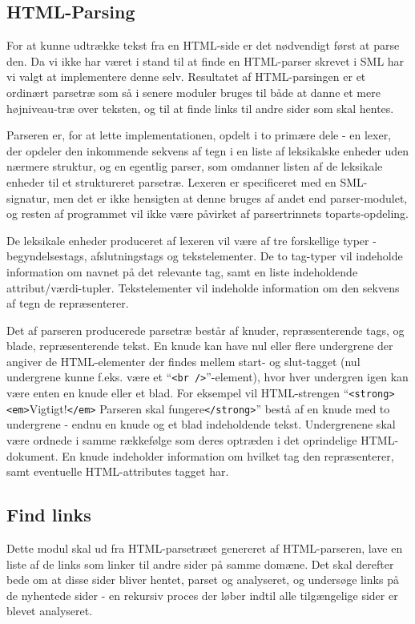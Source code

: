\documentclass[a4paper,oneside,article, titlepage]{article}
\begin{document}
\subsection{HTML-Parsing}
For at kunne udtrække tekst fra en HTML-side er det nødvendigt først
at parse den. Da vi ikke har været i stand til at finde en HTML-parser
skrevet i SML har vi valgt at implementere denne selv. Resultatet af
HTML-parsingen er et ordinært parsetræ som så i senere moduler bruges
til både at danne et mere højniveau-træ over teksten, og til at finde
links til andre sider som skal hentes.

Parseren er, for at lette implementationen, opdelt i to primære dele -
en lexer, der opdeler den inkommende sekvens af tegn i en liste af
leksikalske enheder uden nærmere struktur, og en egentlig parser, som
omdanner listen af de leksikale enheder til et struktureret
parsetræ. Lexeren er specificeret med en SML-signatur, men det er ikke
hensigten at denne bruges af andet end parser-modulet, og resten af
programmet vil ikke være påvirket af parsertrinnets toparts-opdeling.

De leksikale enheder produceret af lexeren vil være af tre forskellige
typer - begyndelsestags, afslutningstags og tekstelementer. De to
tag-typer vil indeholde information om navnet på det relevante tag,
samt en liste indeholdende attribut/værdi-tupler. Tekstelementer vil
indeholde information om den sekvens af tegn de repræsenterer.

Det af parseren producerede parsetræ består af knuder, repræsenterende
tags, og blade, repræsenterende tekst. En knude kan have nul eller
flere undergrene der angiver de HTML-elementer der findes mellem
start- og slut-tagget (nul undergrene kunne f.eks. være et
``\texttt{<br />}''-element), hvor hver undergren igen kan være enten
en knude eller et blad. For eksempel vil HTML-strengen
``\texttt{<strong>}\texttt{<em>}Vigtigt!\texttt{</em>} Parseren skal
fungere\texttt{</strong>}'' bestå af en knude med to undergrene -
endnu en knude og et blad indeholdende tekst. Undergrenene skal være
ordnede i samme rækkefølge som deres optræden i det oprindelige
HTML-dokument. En knude indeholder information om hvilket tag den
repræsenterer, samt eventuelle HTML-attributes tagget har.

\subsection{Find links}
Dette modul skal ud fra HTML-parsetræet genereret af HTML-parseren,
lave en liste af de links som linker til andre sider på samme domæne.
Det skal derefter bede om at disse sider bliver hentet, parset og
analyseret, og undersøge links på de nyhentede sider - en rekursiv
proces der løber indtil alle tilgængelige sider er blevet analyseret.
\end{document}
